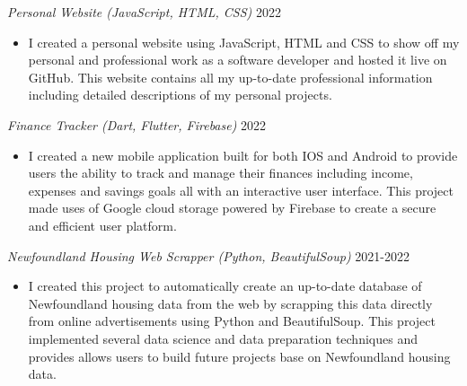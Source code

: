 \textit{Personal Website (JavaScript, HTML, CSS)} \hfill 2022
\begin{itemize}
    \item I created a personal website using JavaScript, HTML and CSS to show off my personal and professional work as a software developer and hosted it live on GitHub. This website contains all my up-to-date professional information including detailed descriptions of my personal projects.
\end{itemize}\par

\textit{Finance Tracker (Dart, Flutter, Firebase)} \hfill 2022
\begin{itemize}
    \item I created a new mobile application built for both IOS and Android to provide users the ability to track and manage their finances including income, expenses and savings goals all with an interactive user interface.  This project made uses of Google cloud storage powered by Firebase to create a secure and efficient user platform.
\end{itemize}\par

\textit{Newfoundland Housing Web Scrapper (Python, BeautifulSoup)} \hfill 2021-2022
\begin{itemize}
    \item I created this project to automatically create an up-to-date database of Newfoundland housing data from the web by scrapping this data directly from online advertisements using Python and BeautifulSoup.  This project implemented several data science and data preparation techniques and provides allows users to build future projects base on Newfoundland housing data.
\end{itemize}\par